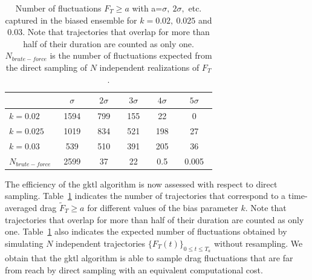 \documentclass[pre,aps,floatfix,10pt,superscriptaddress, notitlepage,preprint]{revtex4-1}
\begin{document}
\begin{table}
	\centering
	\begin{tabular}{|l|c|c|c|c|c|}
		\hline
		& $\sigma$ & $2\sigma$ & $3\sigma$ & $4\sigma$ & $5\sigma$ \\
		\hline
		$k=0.02$ & ~1594~ & ~799~ & ~155~ & 22 & 0  \\ 
		\hline
		$k=0.025~$ & 1019 & 834 & 521 & 198 & 27  \\ 
		\hline
		$k=0.03$ & 539 & 510 & 391 & 205 & 36  \\ 
		\hline
		${N}_{brute-force}$ & 2599 & 37 & 22 & ~0.5~ & ~0.005~ \\
		\hline
	\end{tabular}
	\caption{Number of fluctuations $F_{T} \geq a$ with a=$\sigma,~2\sigma,$ etc. captured in the biased ensemble for $k=0.02,~0.025$ and $0.03$.
		Note that trajectories that overlap for more than half of their duration are counted as only one.
		${N}_{brute-force}$ is the number of fluctuations expected from the direct sampling of $N$ independent realizations of $F_{T}$.}
	\label{tbl:nbTraj_tbl}
\end{table}

%
The efficiency of the \ac{gktl} algorithm is now assessed with respect to direct sampling. 
Table~\ref{tbl:nbTraj_tbl} indicates the number of trajectories that correspond to a time-averaged drag $\tilde{F}_{T} \geq a$ for different values of the bias parameter $k$.
Note that trajectories that overlap for more than half of their duration are counted  as only one.
Table~\ref{tbl:nbTraj_tbl} also indicates the expected number of fluctuations obtained by simulating $N$ independent trajectories $\{F_T(t)\}_{0\leq t \leq T_a}$ without resampling.
%
%
%
%
We obtain that the \ac{gktl} algorithm is able to sample drag fluctuations that are far from reach by direct sampling with an equivalent computational cost.
\end{document}
